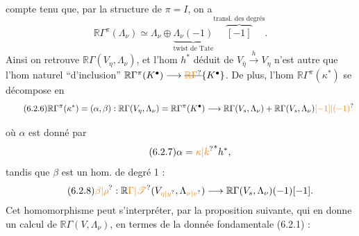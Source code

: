 compte tenu que, par la structure  de $\pi=I$, on a
\[
\tag*{(6.2.5)}\mathbb{R}\Gamma^\pi(\Lambda_\nu)\simeq\Lambda_\nu\oplus\underbrace{\Lambda_\nu(-1)}_{\text{twist de Tate}}\overbrace{[-1]}^{\text{transl. des degrés}}.
\]
Ainsi on retrouve $\mathbb{R}\Gamma(V_\eta,\Lambda_\nu)$, et l'hom $h^*$ déduit de $V_{\bar\eta}\xrightarrow{h}V_\eta$ n'est autre que l'hom naturel ``d'inclusion'' $\mathbb{R}\Gamma^\pi(K^\bullet)\longrightarrow\deleted{\unsure{\mathbb{R}\Gamma}}\{K^\bullet\}$. De plus, l'hom $\mathbb{R}\Gamma^\pi(\kappa^*)$ se décompose en
\[
\tag*{(6.2.6)}\mathbb{R}\Gamma^\pi(\kappa^*)=(\alpha,\beta):\mathbb{R}\Gamma(V_\eta,\Lambda_\nu)=\mathbb{R}\Gamma^\pi(K^\bullet)\longrightarrow\mathbb{R}\Gamma(V_s,\Lambda_\nu)+\mathbb{R}\Gamma(V_s,\Lambda_\nu)\unsure{[-1]|(-1)}
\]

où $\alpha$  est donné par
\[
\tag*{(6.2.7)}\alpha={\unsure{\kappa|k}}^*h^*,
\]
tandis que $\beta$ est un hom. de degré 1 :
\[
\tag*{(6.2.8)}\unsure{\beta|\rho}:\mathbb{R}\unsure{\Gamma|\mathscr{T}}(V_{\unsure{\eta|y}},\Lambda_{\unsure{\nu|v}})\longrightarrow\mathbb{R}\Gamma(V_s,\Lambda_\nu)(-1)[-1].
\]
 Cet homomorphisme peut s'interpréter, par la proposition suivante, qui en  donne un  calcul de $\mathbb{R}\Gamma(V,\Lambda_\nu)$, en termes de la donnée fondamentale  (6.2.1) :

